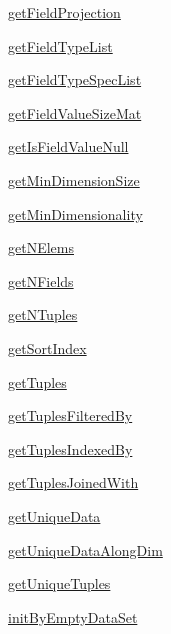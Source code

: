 \begin{list}{}{}
 \item \hyperref[method:smartdb.relations.ATypifiedStaticRelation.getFieldProjection]{getFieldProjection}
 \item \hyperref[method:smartdb.relations.ATypifiedStaticRelation.getFieldTypeList]{getFieldTypeList}
 \item \hyperref[method:smartdb.relations.ATypifiedStaticRelation.getFieldTypeSpecList]{getFieldTypeSpecList}
 \item \hyperref[method:smartdb.relations.ATypifiedStaticRelation.getFieldValueSizeMat]{getFieldValueSizeMat}
 \item \hyperref[method:smartdb.relations.ATypifiedStaticRelation.getIsFieldValueNull]{getIsFieldValueNull}
 \item \hyperref[method:smartdb.relations.ATypifiedStaticRelation.getMinDimensionSize]{getMinDimensionSize}
 \item \hyperref[method:smartdb.relations.ATypifiedStaticRelation.getMinDimensionality]{getMinDimensionality}
 \item \hyperref[method:smartdb.relations.ATypifiedStaticRelation.getNElems]{getNElems}
 \item \hyperref[method:smartdb.relations.ATypifiedStaticRelation.getNFields]{getNFields}
 \item \hyperref[method:smartdb.relations.ATypifiedStaticRelation.getNTuples]{getNTuples}
 \item \hyperref[method:smartdb.relations.ATypifiedStaticRelation.getSortIndex]{getSortIndex}
 \item \hyperref[method:smartdb.relations.ATypifiedStaticRelation.getTuples]{getTuples}
 \item \hyperref[method:smartdb.relations.ATypifiedStaticRelation.getTuplesFilteredBy]{getTuplesFilteredBy}
 \item \hyperref[method:smartdb.relations.ATypifiedStaticRelation.getTuplesIndexedBy]{getTuplesIndexedBy}
 \item \hyperref[method:smartdb.relations.ATypifiedStaticRelation.getTuplesJoinedWith]{getTuplesJoinedWith}
 \item \hyperref[method:smartdb.relations.ATypifiedStaticRelation.getUniqueData]{getUniqueData}
 \item \hyperref[method:smartdb.relations.ATypifiedStaticRelation.getUniqueDataAlongDim]{getUniqueDataAlongDim}
 \item \hyperref[method:smartdb.relations.ATypifiedStaticRelation.getUniqueTuples]{getUniqueTuples}
 \item \hyperref[method:smartdb.relations.ATypifiedStaticRelation.initByEmptyDataSet]{initByEmptyDataSet}

\end{list}
